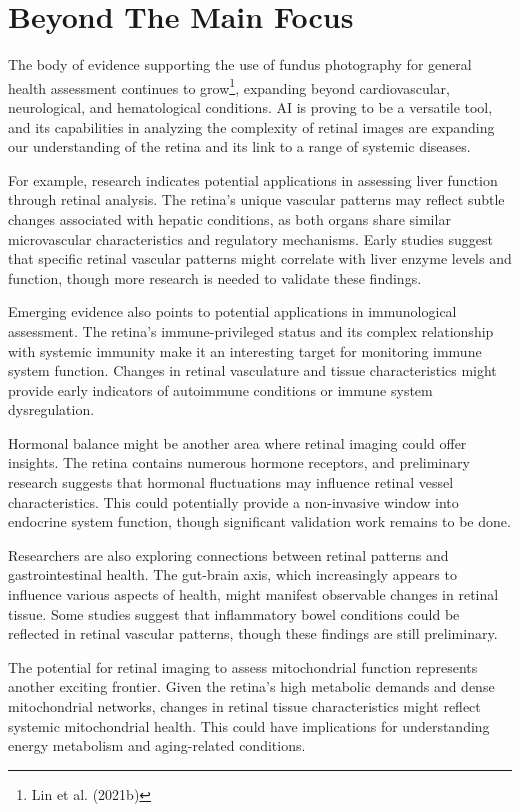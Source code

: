 \documentclass[
  Letterpaper,
]{scrbook}
\begin{document}
\section{Beyond The Main Focus}\label{beyond-the-main-focus}

The body of evidence supporting the use of fundus photography for
general health assessment continues to grow\footnote{Lin et al. (2021b)},
expanding beyond cardiovascular, neurological, and hematological
conditions. AI is proving to be a versatile tool, and its capabilities
in analyzing the complexity of retinal images are expanding our
understanding of the retina and its link to a range of systemic
diseases.

For example, research indicates potential applications in assessing
liver function through retinal analysis. The retina's unique vascular
patterns may reflect subtle changes associated with hepatic conditions,
as both organs share similar microvascular characteristics and
regulatory mechanisms. Early studies suggest that specific retinal
vascular patterns might correlate with liver enzyme levels and function,
though more research is needed to validate these findings.

Emerging evidence also points to potential applications in immunological
assessment. The retina's immune-privileged status and its complex
relationship with systemic immunity make it an interesting target for
monitoring immune system function. Changes in retinal vasculature and
tissue characteristics might provide early indicators of autoimmune
conditions or immune system dysregulation.

Hormonal balance might be another area where retinal imaging could offer
insights. The retina contains numerous hormone receptors, and
preliminary research suggests that hormonal fluctuations may influence
retinal vessel characteristics. This could potentially provide a
non-invasive window into endocrine system function, though significant
validation work remains to be done.

Researchers are also exploring connections between retinal patterns and
gastrointestinal health. The gut-brain axis, which increasingly appears
to influence various aspects of health, might manifest observable
changes in retinal tissue. Some studies suggest that inflammatory bowel
conditions could be reflected in retinal vascular patterns, though these
findings are still preliminary.

The potential for retinal imaging to assess mitochondrial function
represents another exciting frontier. Given the retina's high metabolic
demands and dense mitochondrial networks, changes in retinal tissue
characteristics might reflect systemic mitochondrial health. This could
have implications for understanding energy metabolism and aging-related
conditions.
\end{document}
